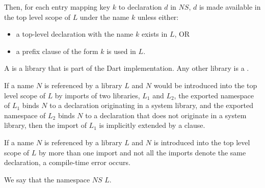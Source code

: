 \documentclass[makeidx]{article}
\begin{document}
{\LMHash{}%
Then, for each entry mapping key $k$ to declaration $d$ in $NS$, $d$ is made available in the top level scope of $L$ under the name $k$ unless either:
\begin{itemize}
\item
a top-level declaration with the name $k$ exists in $L$, OR
\item a prefix clause of the form \AS{} $k$ is used in $L$.
\end{itemize}


\LMHash{}%
A  is a library that is part of the Dart implementation.
Any other library is a .

If a name $N$ is referenced by a library $L$
and $N$ would be introduced into the top level scope of $L$
by imports of two libraries, $L_1$ and $L_2$,
the exported namespace of $L_1$ binds $N$
to a declaration originating in a system library,
and the exported namespace of $L_2$ binds $N$ to a declaration
that does not originate in a system library,
then the import of $L_1$ is implicitly extended by a  clause.


\LMHash{}%
If a name $N$ is referenced by a library $L$ and $N$ is introduced into the top level scope of $L$ by more than one import
and not all the imports denote the same declaration,
a compile-time error occurs.

\LMHash{}%
We say that the namespace $NS$
 $L$.


}
\end{document}
